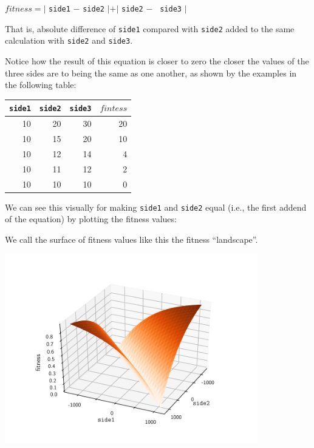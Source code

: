 \begin{center}
$\mathit{fitness} = |$ {\tt side1} $-$ {\tt side2} $| + |$ {\tt side2} $-$ {\tt
side3} $|$
\end{center}

That is, absolute difference of {\tt side1} compared with {\tt side2} added to
the same calculation with {\tt side2} and {\tt side3}.

Notice how the result of this equation is closer to zero the closer the values
of the three sides are to being the same as one another, as shown by the
examples in the following table:

\begin{center}
    \begin{tabular}{rrrr}
        \toprule 
        {\tt side1} & {\tt side2} & {\tt side3} & $\mathit{fintess}$ \\
        \midrule
        10 & 20 & 30 & 20 \\
        10 & 15 & 20 & 10 \\
        10 & 12 & 14 & 4  \\
        10 & 11 & 12 & 2  \\
        10 & 10 & 10 & 0  \\
        \bottomrule
    \end{tabular}
\end{center}

We can see this visually for making {\tt side1} and {\tt side2} equal (i.e., the
first addend of the equation) by plotting the fitness values:

We call the surface of fitness values like this the fitness ``landscape''. 

\begin{center}
    \vspace{-1em}
    \includegraphics[width=11cm]{plots/sbst-side1-equals-side2.pdf}
    \vspace{-1em}
\end{center}

